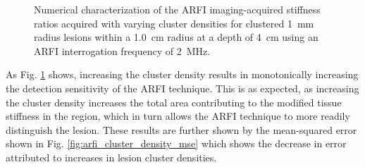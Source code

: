 			\begin{figure}[!htb]
				\centering
				\caption[Numerical characterization of ARFI imaging-acquired stiffness ratio with clustered lesions]{Numerical characterization of the ARFI imaging-acquired stiffness ratios acquired with varying cluster densities for clustered \SI{1}{\mm} radius lesions within a \SI{1.0}{cm} radius at a depth of \SI{4}{\cm} using an ARFI interrogation frequency of \SI{2}{\MHz}.}
				\label{fig:arfi_cluster_density}
			\end{figure}

			As Fig. \ref{fig:arfi_cluster_density} shows, increasing the cluster density results in monotonically increasing the detection sensitivity of the ARFI technique. This is as expected, as increasing the cluster density increases the total area contributing to the modified tissue stiffness in the region, which in turn allows the ARFI technique to more readily distinguish the lesion. These results are further shown by the mean-squared error shown in Fig. \ref{fig:arfi_cluster_density_mse} which shows the decrease in error attributed to increases in lesion cluster densities.

